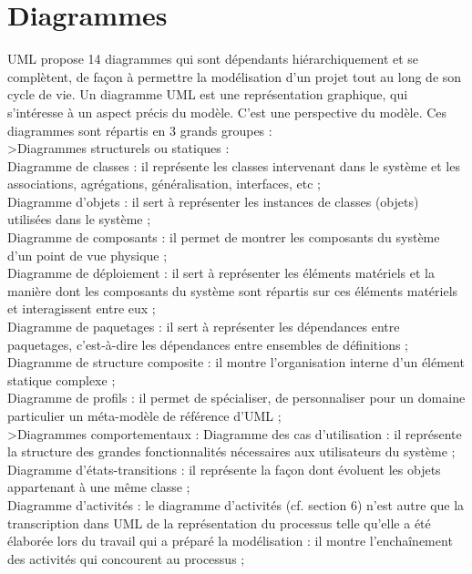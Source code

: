\section{Diagrammes}
UML propose 14 diagrammes qui sont dépendants hiérarchiquement et se complètent, de façon à permettre la modélisation d'un projet tout au long de son cycle de vie. Un diagramme UML est une représentation graphique, qui s'intéresse à un aspect précis du modèle. C'est une perspective du modèle. Ces diagrammes sont répartis en 3 grands groupes : \\
\textgreater Diagrammes structurels ou statiques : \\
\textbullet Diagramme de classes : il représente les classes intervenant dans le système et les
associations, agrégations, généralisation, interfaces, etc ;\\
\textbullet Diagramme d'objets : il sert à représenter les instances de classes (objets) utilisées dans le système ;\\
\textbullet Diagramme de composants : il permet de montrer les composants du système d'un point de vue physique ; \\
\textbullet Diagramme de déploiement : il sert à représenter les éléments matériels et la manière dont les composants du système sont répartis sur ces éléments matériels et interagissent entre eux ;\\
\textbullet Diagramme de paquetages : il sert à représenter les dépendances entre paquetages, c’est-à-dire les dépendances entre ensembles de définitions ;\\
\textbullet Diagramme de structure composite : il montre l’organisation interne d’un élément statique complexe ;\\
\textbullet Diagramme de profils : il permet de spécialiser, de personnaliser pour un domaine particulier un méta-modèle de référence d'UML ;\\
\textgreater Diagrammes comportementaux :
\textbullet Diagramme des cas d'utilisation : il représente la structure des grandes fonctionnalités nécessaires aux utilisateurs du système ;\\ 
\textbullet Diagramme d'états-transitions : il représente la façon dont évoluent les objets appartenant à une même classe ; \\
\textbullet Diagramme d'activités : le diagramme d'activités (cf. section 6) n'est autre que la transcription dans UML de la représentation du processus telle qu'elle a été élaborée lors du travail qui a préparé la modélisation : il montre l'enchaînement des activités qui concourent au processus ; \\
